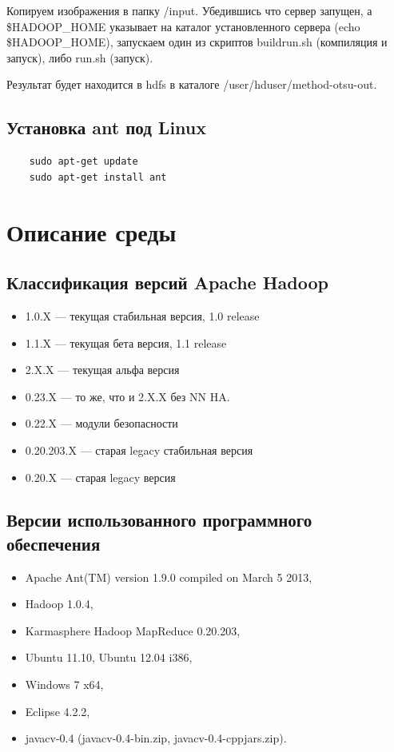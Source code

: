 \documentclass[12pt,a4paper]{extarticle} %
\begin{document}
    Копируем изображения в папку /input. Убедившись что сервер запущен, а \$HADOOP\_HOME указывает на каталог установленного сервера (echo \$HADOOP\_HOME), запускаем один из скриптов buildrun.sh (компиляция и запуск), либо run.sh (запуск).

    Результат будет находится в hdfs в каталоге /user/hduser/method-otsu-out.

\subsection{Установка ant под Linux}
\begin{lstlisting}
    sudo apt-get update 
    sudo apt-get install ant
\end{lstlisting}

\newpage
\section{Описание среды}

\subsection{Классификация версий Apache Hadoop}
\begin{itemize}
    \item[] 1.0.X ---  текущая стабильная версия, 1.0 release
    \item[] 1.1.X  ---  текущая бета версия, 1.1 release
    \item[] 2.X.X  ---  текущая альфа версия
    \item[] 0.23.X  ---  то же, что и 2.X.X без NN HA.
    \item[] 0.22.X  ---  модули безопасности 
    \item[] 0.20.203.X  ---  старая legacy стабильная версия
    \item[] 0.20.X  ---  старая legacy версия
\end{itemize}


\subsection{Версии использованного программного обеспечения} \label{sec:envsoft}
\begin{itemize}
    \item[] Apache Ant(TM) version 1.9.0 compiled on March 5 2013,
    \item[] Hadoop 1.0.4,
    \item[] Karmasphere Hadoop MapReduce 0.20.203,
    \item[] Ubuntu 11.10, Ubuntu 12.04 i386,
    \item[] Windows 7 x64,
    \item[] Eclipse 4.2.2,
    \item[] javacv-0.4 (javacv-0.4-bin.zip, javacv-0.4-cppjars.zip).
\end{itemize}
\end{document}
